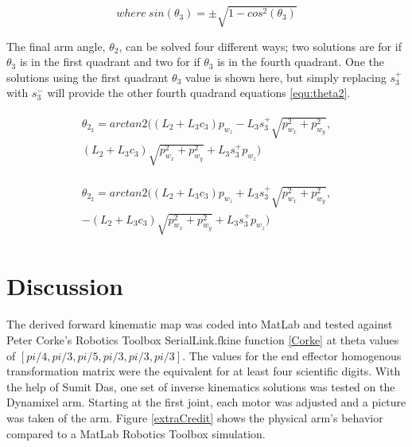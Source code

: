 \documentclass[10pt,journal]{IEEEtran}
\begin{document}
\begin{equation*}
	where\ sin(\theta_3) = \pm\sqrt{1-cos^2(\theta_3)}
\end{equation*}

The final arm angle, $\theta_2$, can be solved four different ways; two solutions are for if $\theta_3$ is in the first quadrant and two for if $\theta_3$ is in the fourth quadrant. One the solutions using the first quadrant $\theta_3$ value is shown here, but simply replacing $s_3^+$ with $s_3^-$ will provide the other fourth quadrand equations \ref{equ:theta2}.

\begin{align}\label{equ:theta2}
\begin{split}
	\theta_{2_2} = arctan2((L_2 + L_3 c_3) p_{w_z} - L_3 s^+_3 \sqrt{p^2_{w_x} + p^2_{w_y}},
	\\ (L_2+L_3 c_3) \sqrt{p^2_{w_x} + p^2_{w_y}}+ L_3 s^+_3 p_{w_z})
\end{split}
\end{align}

\begin{align}\label{equ:theta2}
\begin{split}
	\theta_{2_2} = arctan2((L_2 + L_3 c_3) p_{w_z} + L_3 s^+_3 \sqrt{p^2_{w_x} + p^2_{w_y}},
	\\ -(L_2+L_3 c_3) \sqrt{p^2_{w_x} + p^2_{w_y}}+ L_3 s^+_3 p_{w_z})
\end{split}
\end{align}

\section{Discussion}
The derived forward kinematic map was coded into MatLab and tested against Peter Corke's Robotics Toolbox SerialLink.fkine function \ref{Corke} at theta values of $[pi/4, pi/3, pi/5, pi/3, pi/3, pi/3]$. The values for the end effector homogenous transformation matrix were the equivalent for at least four scientific digits. With the help of Sumit Das, one set of inverse kinematics solutions was tested on the Dynamixel arm. Starting at the first joint, each motor was adjusted and a picture was taken of the arm. Figure \ref{extraCredit} shows the physical arm's behavior compared to a MatLab Robotics Toolbox simulation.




 
 
\end{document}
